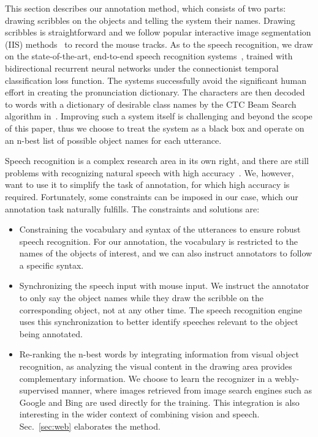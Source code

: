 \documentclass[runningheads]{llncs}
\begin{document}
This section describes our annotation method, which consists of two 
parts: drawing scribbles on the objects and telling the system their 
names. Drawing scribbles is straightforward and we follow popular
interactive image segmentation (IIS) methods~\citep{geodesic:star} to
record the mouse tracks. As to the speech recognition, we draw on the state-of-the-art, end-to-end speech recognition systems~\citep{end-to-end:speech}, trained with bidirectional recurrent neural networks under the connectionist temporal classification loss function. The systems successfully avoid the significant human effort in creating the pronunciation dictionary. The characters are then decoded to words with a dictionary of desirable class names by the CTC Beam Search algorithm in~\citep{end-to-end:speech}. Improving such a system itself is challenging and beyond the scope of this paper, thus we choose to treat the system as a black box and operate on an n-best list of possible object names for each utterance. 

Speech recognition is a complex research area in its own right, and there are still problems  with recognizing natural speech with high accuracy~\citep{SR:review}. We, however, want to use it to simplify 
the task of annotation, for which high accuracy is required. Fortunately, some 
constraints can be imposed in our case, which our annotation task naturally 
fulfills. The constraints and solutions are:
\begin{itemize}
\item Constraining the vocabulary and syntax of the utterances to
  ensure robust speech recognition. For our annotation, the vocabulary
  is restricted to the names  of the objects of interest,
  and we can also instruct annotators to follow a specific syntax.

\item Synchronizing the speech input with mouse input. We instruct the annotator to only say the object names while they draw the scribble on the corresponding object, not at any other time. The speech recognition engine uses this synchronization to better identify speeches relevant to the object being annotated.

\item Re-ranking the n-best words by integrating information from visual object recognition, as analyzing the visual content in the drawing area provides complementary information. We choose to learn the recognizer in a webly-supervised manner, where images retrieved from image search engines such as Google and Bing are used directly for the training. This integration is also interesting in the wider context of combining vision and speech.  Sec.~\ref{sec:web} elaborates the method. 

\end{itemize}
\end{document}
